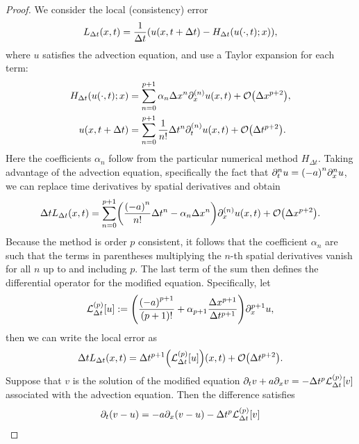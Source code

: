 \begin{proof}
	We consider the local (consistency) error
	\[
		L_{\Delta t}\parentheses*{x, t} = \frac{1}{\Delta t}\parentheses*{u\parentheses*{x, t + \Delta t} - H_{\Delta t}\parentheses*{u\parentheses*{\cdot, t}; x}},
	\]
	where \(u\) satisfies the advection equation, and use a Taylor expansion for each term:
	\begin{align*}
		H_{\Delta t}\parentheses*{u\parentheses*{\cdot, t}; x} &= \sum_{n = 0}^{p + 1}\alpha_n \Delta x^n \partial_x^{\parentheses*{n}}u\parentheses*{x, t} + \mathcal{O}\parentheses*{\Delta x^{p + 2}},\\
		u\parentheses*{x, t + \Delta t} &= \sum_{n = 0}^{p + 1}\frac{1}{n!}\Delta t^n \partial_t^{\parentheses*{n}}u\parentheses*{x, t} + \mathcal{O}\parentheses*{\Delta t^{p + 2}}.
	\end{align*}
	Here the coefficients \(\alpha_n\) follow from the particular numerical method \(H_{\Delta t}\).
	Taking advantage of the advection equation, specifically the fact that \(\partial_t^n u = \parentheses*{-a}^n \partial_x^n u\), we can replace time derivatives by spatial derivatives and obtain
	\[
		\Delta tL_{\Delta t}\parentheses*{x, t} = \sum_{n = 0}^{p + 1}\parentheses*{\frac{\parentheses*{-a}^n}{n!}\Delta t^n - \alpha_n \Delta x^n}\partial_x^{\parentheses*{n}}u\parentheses*{x, t} + \mathcal{O}\parentheses*{\Delta x^{p + 2}}.
	\]
	Because the method is order \(p\) consistent, it follows that the coefficient \(\alpha_n\) are such that the terms in parentheses multiplying the \(n\)-th spatial derivatives vanish for all \(n\) up to and including \(p\).
	The last term of the sum then defines the differential operator for the modified equation.
	Specifically, let
	\[
		\mathcal{L}_{\Delta t}^{\parentheses*{p}}\brackets*{u} := \parentheses*{\frac{\parentheses*{-a}^{p + 1}}{\parentheses*{p + 1}!} + \alpha_{p + 1}\frac{\Delta x^{p + 1}}{\Delta t^{p + 1}}}\partial_x^{p + 1}u,
	\]
	then we can write the local error as
	\[
		\Delta tL_{\Delta t}\parentheses*{x, t} = \Delta t^{p + 1}\parentheses*{\mathcal{L}_{\Delta t}^{\parentheses*{p}}\brackets*{u}}\parentheses*{x, t} + \mathcal{O}\parentheses*{\Delta t^{p + 2}}.
	\]
	Suppose that \(v\) is the solution of the modified equation \(\partial_t v + a\partial_x v = -\Delta t^p \mathcal{L}_{\Delta t}^{\parentheses*{p}}\brackets*{v}\) associated with the advection equation.
	Then the difference satisfies
	\begin{align*}
		\partial_t \parentheses*{v - u} &= -a\partial_x \parentheses*{v - u} - \Delta t^p \mathcal{L}_{\Delta t}^{\parentheses*{p}}\brackets*{v}\\

\end{align*}
\end{proof}
